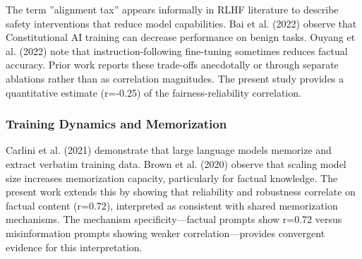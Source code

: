 The term ''alignment tax'' appears informally in RLHF literature to describe safety interventions that reduce model capabilities. Bai et al. (2022) observe that Constitutional AI training can decrease performance on benign tasks. Ouyang et al. (2022) note that instruction-following fine-tuning sometimes reduces factual accuracy. Prior work reports these trade-offs anecdotally or through separate ablations rather than as correlation magnitudes. The present study provides a quantitative estimate (r=-0.25) of the fairness-reliability correlation.

\subsubsection{Training Dynamics and Memorization}

Carlini et al. (2021) demonstrate that large language models memorize and extract verbatim training data. Brown et al. (2020) observe that scaling model size increases memorization capacity, particularly for factual knowledge. The present work extends this by showing that reliability and robustness correlate on factual content (r=0.72), interpreted as consistent with shared memorization mechanisms. The mechanism specificity---factual prompts show r=0.72 versus misinformation prompts showing weaker correlation---provides convergent evidence for this interpretation.
